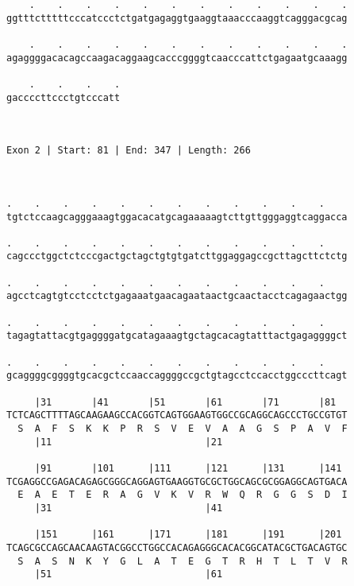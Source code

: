 \documentclass{article}
\begin{document}
\begin{Verbatim}
    .    .    .    .    .    .    .    .    .    .    .    .
ggtttctttttcccatccctctgatgagaggtgaaggtaaacccaaggtcagggacgcag
                                                            
    .    .    .    .    .    .    .    .    .    .    .    .
agaggggacacagccaagacaggaagcacccggggtcaacccattctgagaatgcaaagg
                                                            
    .    .    .    .
gaccccttccctgtcccatt
                    
                    
 
Exon 2 | Start: 81 | End: 347 | Length: 266



.    .    .    .    .    .    .    .    .    .    .    .    
tgtctccaagcagggaaagtggacacatgcagaaaaagtcttgttgggaggtcaggacca
                                                            
.    .    .    .    .    .    .    .    .    .    .    .    
cagccctggctctcccgactgctagctgtgtgatcttggaggagccgcttagcttctctg
                                                            
.    .    .    .    .    .    .    .    .    .    .    .    
agcctcagtgtcctcctctgagaaatgaacagaataactgcaactacctcagagaactgg
                                                            
.    .    .    .    .    .    .    .    .    .    .    .    
tagagtattacgtgaggggatgcatagaaagtgctagcacagtatttactgagaggggct
                                                            
.    .    .    .    .    .    .    .    .    .    .    .    
gcaggggcggggtgcacgctccaaccaggggccgctgtagcctccacctggcccttcagt
                                                            
     |31       |41       |51       |61       |71       |81  
TCTCAGCTTTTAGCAAGAAGCCACGGTCAGTGGAAGTGGCCGCAGGCAGCCCTGCCGTGT
  S  A  F  S  K  K  P  R  S  V  E  V  A  A  G  S  P  A  V  F
     |11                           |21                      
  
     |91       |101      |111      |121      |131      |141 
TCGAGGCCGAGACAGAGCGGGCAGGAGTGAAGGTGCGCTGGCAGCGCGGAGGCAGTGACA
  E  A  E  T  E  R  A  G  V  K  V  R  W  Q  R  G  G  S  D  I
     |31                           |41                      
  
     |151      |161      |171      |181      |191      |201 
TCAGCGCCAGCAACAAGTACGGCCTGGCCACAGAGGGCACACGGCATACGCTGACAGTGC
  S  A  S  N  K  Y  G  L  A  T  E  G  T  R  H  T  L  T  V  R
     |51                           |61                      
  

\end{Verbatim}
\end{document}
